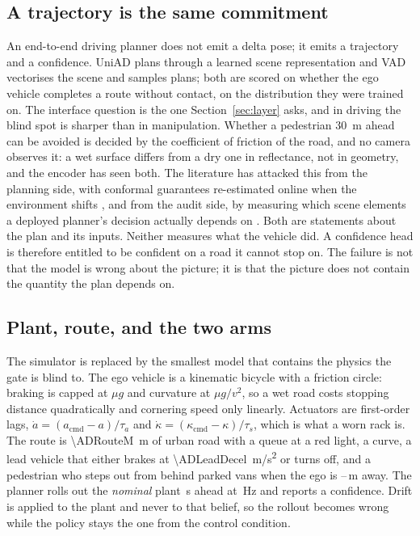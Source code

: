 \documentclass[conference]{IEEEtran}
\theoremstyle{definition}
\begin{document}
\subsection{A trajectory is the same commitment}

An end-to-end driving planner does not emit a delta pose; it emits a trajectory
and a confidence. UniAD \cite{hu2023uniad} plans through a learned scene
representation and VAD \cite{chen2023vad} vectorises the scene and samples
plans; both are scored on whether the ego vehicle completes a route without
contact, on the distribution they were trained on. The interface question is the
one Section~\ref{sec:layer} asks, and in driving the blind spot is sharper than
in manipulation. Whether a pedestrian \SI{30}{m} ahead can be avoided is decided
by the coefficient of friction of the road, and no camera observes it: a wet
surface differs from a dry one in reflectance, not in geometry, and the encoder
has seen both. The literature has attacked this from the planning side, with
conformal guarantees re-estimated online when the environment shifts
\cite{rahaman2026environments}, and from the audit side, by measuring which
scene elements a deployed planner's decision actually depends on
\cite{guo2026cadet}. Both are statements about the plan and its inputs. Neither
measures what the vehicle did. A confidence head is therefore entitled to be
confident on a road it cannot stop on. The failure is not that the model is
wrong about the picture; it is that the picture does not contain the quantity
the plan depends on.

\subsection{Plant, route, and the two arms}

The simulator is replaced by the smallest model that contains the physics the
gate is blind to. The ego vehicle is a kinematic bicycle with a friction circle:
braking is capped at $\mu g$ and curvature at $\mu g/v^{2}$, so a wet road costs
stopping distance quadratically and cornering speed only linearly. Actuators are
first-order lags, $\dot a=(a_{\mathrm{cmd}}-a)/\tau_a$ and
$\dot\kappa=(\kappa_{\mathrm{cmd}}-\kappa)/\tau_s$, which is what a worn rack
is. The route is \SI{\ADRouteM}{m} of urban road with a queue at a red light, a
curve, a lead vehicle that either brakes at \SI{\ADLeadDecel}{m/s^2} or turns
off, and a pedestrian who steps out from behind parked vans when the ego is
\ADPedNear--\ADPedFar\,m away. The planner rolls out the \emph{nominal} plant
\ADHorizonS\,s ahead at \ADPlannerHz\,Hz and reports a confidence. Drift is
applied to the plant and never to that belief, so the rollout becomes wrong
while the policy stays the one from the control condition.
\end{document}
